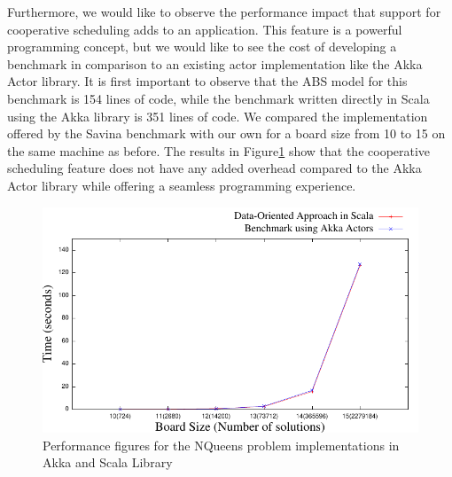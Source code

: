 \par Furthermore, we would like to observe the performance impact that support for cooperative scheduling adds to an application. This feature is a powerful programming concept, but we would like to see the cost of developing a benchmark in comparison to an existing actor implementation like the Akka Actor library. It is first important to observe that the ABS model for this benchmark is 154 lines of code, while the benchmark written directly in Scala using the Akka library is 351 lines of code. We compared the implementation offered by the Savina benchmark with our own for a board size from 10  to 15 on the same machine as before. The results in Figure\ref{aj} show that the cooperative scheduling feature does not have any added overhead compared to the Akka Actor library while offering a seamless programming experience.

\begin{figure}
\centering
\includegraphics[scale=.7]{akka8.pdf}
\caption{Performance figures for the NQueens problem implementations in Akka and Scala Library}
\label{aj}
\end{figure}



